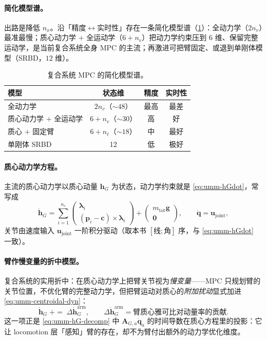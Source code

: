 \paragraph{简化模型谱。}
出路是降低 $n_x$。沿「精度$\leftrightarrow$实时性」存在一条简化模型谱（\cref{tab:umm-models}）：全动力学（$2n_v$）最准最慢；质心动力学 $+$ 全运动学（$6+n_v$）把动力学约束压到 $6$ 维、保留完整运动学，是当前复合系统全身 MPC 的主流；再激进可把臂固定、或退到单刚体模型（SRBD，$12$ 维）。

\begin{table}[H]\centering\small
\caption{复合系统 MPC 的简化模型谱。}
\label{tab:umm-models}
\begin{tabular}{lccc}
\toprule
模型 & 状态维 & 精度 & 实时性 \\
\midrule
全动力学 & $2n_v$（$\sim48$） & 最高 & 最差 \\
质心动力学 $+$ 全运动学 & $6+n_v$（$\sim30$） & 高 & 好 \\
质心 $+$ 固定臂 & $6+n_\ell$（$\sim18$） & 中 & 最好 \\
单刚体 SRBD & 12 & 低 & 极好 \\
\bottomrule
\end{tabular}
\end{table}

\paragraph{质心动力学方程。}
主流的质心动力学以质心动量 $\mathbf h_G$ 为状态，动力学约束就是 \cref{eq:umm-hGdot}，常写成
\begin{equation}
  \dot{\mathbf h}_G=\sum_{i=1}^{n_c}\begin{pmatrix}\boldsymbol\lambda_i\\ (\mathbf p_i-\mathbf c)\times\boldsymbol\lambda_i\end{pmatrix}+\begin{pmatrix}m_{\text{tot}}\mathbf g\\ \mathbf 0\end{pmatrix},
  \qquad \dot{\mathbf q}=\mathbf u_{\text{joint}},
  \label{eq:umm-centroidal-dyn}
\end{equation}
关节由速度输入 $\mathbf u_{\text{joint}}$ 一阶积分驱动（取本书 $[\text{线};\text{角}]$ 序，与 \cref{eq:umm-hGdot} 一致）。

\paragraph{臂作慢变量的折中模型。}
复合系统的实用折中：在质心动力学上把臂关节视为\emph{慢变量}——MPC 只规划臂的关节位置，不优化臂的完整动力学，但把臂运动对质心的\emph{附加扰动}显式加进 \cref{eq:umm-centroidal-dyn}：
\begin{equation}
  \dot{\mathbf h}_G\;{+}{=}\;\Delta\dot{\mathbf h}_G^{\text{arm}},
  \qquad \Delta\dot{\mathbf h}_G^{\text{arm}}=\text{臂质心雅可比对动量率的贡献}.
  \label{eq:umm-arm-disturb}
\end{equation}
这一项正是 \cref{eq:umm-hG-decomp} 中 $\mathbf A_{G,a}\dot{\mathbf q}_a$ 的时间导数在质心方程里的投影：它让 locomotion 层「感知」臂的存在，却不为臂付出额外的动力学优化维度。

